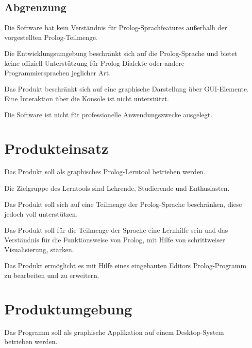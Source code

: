 \documentclass[parskip=full,11pt,twoside]{scrartcl}
\begin{document}
\subsection{Abgrenzung}


Die Software hat kein Verständnis für Prolog-Sprachfeatures außerhalb der vorgestellten Prolog-Teilmenge.


Die Entwicklungsumgebung beschränkt sich auf die Prolog-Sprache und bietet keine offiziell Unterstützung für Prolog-Dialekte oder andere Programmiersprachen jeglicher Art.


Das Produkt beschränkt sich auf eine graphische Darstellung über GUI-Elemente. Eine Interaktion über die Konsole ist nicht unterstützt.


Die Software ist nicht für professionelle Anwendungszwecke ausgelegt.

\pagebreak
\section{Produkteinsatz}

Das Produkt soll als graphisches Prolog-Lerntool betrieben werden.

Die Zielgruppe des Lerntools sind Lehrende, Studierende und Enthusiasten.

Das Produkt soll sich auf eine Teilmenge der Prolog-Sprache beschränken, diese jedoch voll unterstützen.

Das Produkt soll für die Teilmenge der Sprache eine Lernhilfe sein und das Verständnis für die Funktionsweise von Prolog, mit Hilfe von schrittweiser Visualisierung, stärken.

Das Produkt ermöglicht es mit Hilfe eines eingebauten Editors Prolog-Programm zu bearbeiten und zu erweitern.

\section{Produktumgebung}

Das Programm soll als graphische Applikation auf einem Desktop-System betrieben werden.
\end{document}
